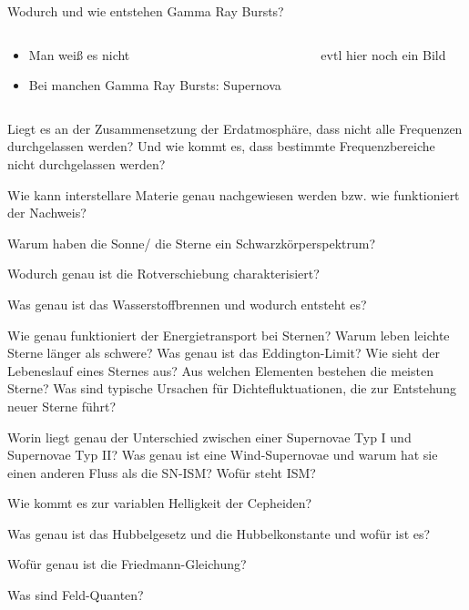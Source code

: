 \begin{frame}{Wodurch und wie entstehen Gamma Ray Bursts?}
  \begin{columns}
 \begin{column}{0.4\textwidth}
  \begin{itemize}
    \item  Man weiß es nicht
    \item  Bei manchen Gamma Ray Bursts: Supernova
  \end{itemize}
\vspace{2em}
\end{column}
\begin{column}{0.6\textwidth}
  evtl hier noch ein Bild
\end{column}
  \end{columns}
\end{frame}

\begin{frame}


Liegt es an der Zusammensetzung der Erdatmosphäre, dass nicht alle Frequenzen durchgelassen werden? Und wie kommt es, dass bestimmte Frequenzbereiche nicht durchgelassen werden?

Wie kann interstellare Materie genau nachgewiesen werden bzw. wie funktioniert der Nachweis?

Warum haben die Sonne/ die Sterne ein Schwarzkörperspektrum?

Wodurch genau ist die Rotverschiebung charakterisiert?

Was genau ist das Wasserstoffbrennen und wodurch entsteht es?

Wie genau funktioniert der Energietransport bei Sternen? Warum leben leichte Sterne länger als schwere? Was genau ist das Eddington-Limit?   Wie sieht der Lebeneslauf eines Sternes aus?
Aus welchen Elementen bestehen die meisten Sterne?  Was sind typische Ursachen für Dichtefluktuationen, die zur Entstehung neuer Sterne führt?

Worin liegt genau der Unterschied zwischen einer Supernovae Typ I und Supernovae Typ II?
Was genau ist eine Wind-Supernovae und warum hat sie einen anderen Fluss als die SN-ISM? Wofür steht ISM?

Wie kommt es zur variablen Helligkeit der Cepheiden?

Was genau ist das Hubbelgesetz und die Hubbelkonstante und wofür ist es?

Wofür genau ist die Friedmann-Gleichung?

Was sind Feld-Quanten?

\end{frame}
